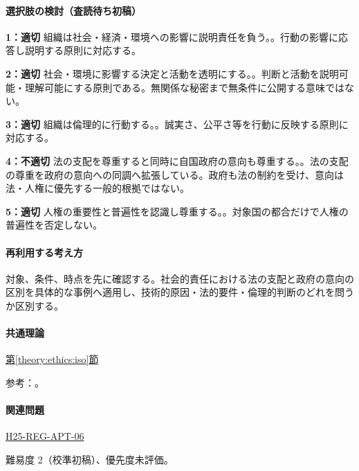 \paragraph{選択肢の検討（査読待ち初稿）}\mbox{}\par

\noindent\textbf{1：適切} 組織は社会・経済・環境への影響に説明責任を負う。。行動の影響に応答し説明する原則に対応する。\par

\noindent\textbf{2：適切} 社会・環境に影響する決定と活動を透明にする。。判断と活動を説明可能・理解可能にする原則である。無関係な秘密まで無条件に公開する意味ではない。\par

\noindent\textbf{3：適切} 組織は倫理的に行動する。。誠実さ、公平さ等を行動に反映する原則に対応する。\par

\noindent\textbf{4：不適切} 法の支配を尊重すると同時に自国政府の意向も尊重する。。法の支配の尊重を政府の意向への同調へ拡張している。政府も法の制約を受け、意向は法・人権に優先する一般的根拠ではない。\par

\noindent\textbf{5：適切} 人権の重要性と普遍性を認識し尊重する。。対象国の都合だけで人権の普遍性を否定しない。\par

\paragraph{再利用する考え方} 対象、条件、時点を先に確認する。社会的責任における法の支配と政府の意向の区別を具体的な事例へ適用し、技術的原因・法的要件・倫理的判断のどれを問うか区別する。

\paragraph{共通理論} \hyperref[theory:ethics:iso]{第\ref*{theory:ethics:iso}節}

\par 参考：\cite{iso26000,iso_gri2014}。

\paragraph{関連問題} \hyperref[q:h25-reg-apt-06]{H25-REG-APT-06}

\par 難易度 2（校準初稿）、優先度未評価。

